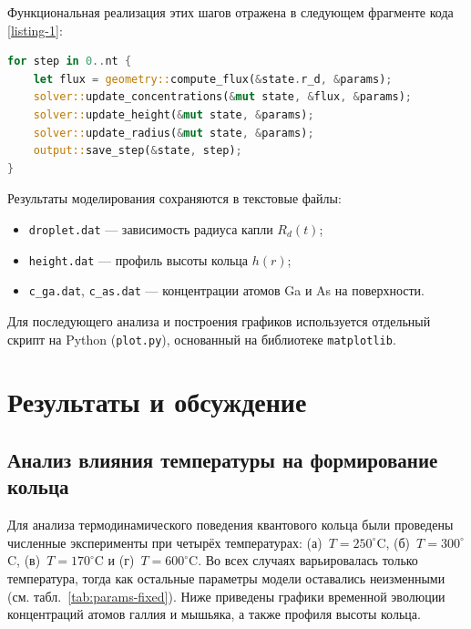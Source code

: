 \documentclass[14pt,oneside]{extarticle}
\begin{document}
Функциональная реализация этих шагов отражена в следующем фрагменте кода \ref{listing-1}:

\begin{lstlisting}[language=Rust, caption={Основной цикл численного расчёта\label{listing-1}}]
for step in 0..nt {
    let flux = geometry::compute_flux(&state.r_d, &params);
    solver::update_concentrations(&mut state, &flux, &params);
    solver::update_height(&mut state, &params);
    solver::update_radius(&mut state, &params);
    output::save_step(&state, step);
}
\end{lstlisting}

Результаты моделирования сохраняются в текстовые файлы:
\begin{itemize}
    \item \texttt{droplet.dat} — зависимость радиуса капли $R_d(t)$;
    \item \texttt{height.dat} — профиль высоты кольца $h(r)$;
    \item \texttt{c\_ga.dat}, \texttt{c\_as.dat} — концентрации атомов Ga и As на поверхности.
\end{itemize}

Для последующего анализа и построения графиков используется отдельный скрипт на Python (\texttt{plot.py}), основанный на библиотеке \texttt{matplotlib}.

\pagebreak
\section{Результаты и обсуждение}

\subsection{Анализ влияния температуры на формирование кольца}

Для анализа термодинамического поведения квантового кольца были проведены численные эксперименты при четырёх температурах: (а)~$T = 250^\circ$C, (б)~$T = 300^\circ$C, (в)~$T = 170^\circ$C и (г)~$T = 600^\circ$C. Во всех случаях варьировалась только температура, тогда как остальные параметры модели оставались неизменными (см. табл.~\ref{tab:params-fixed}). Ниже приведены графики временной эволюции концентраций атомов галлия и мышьяка, а также профиля высоты кольца.
\end{document}
